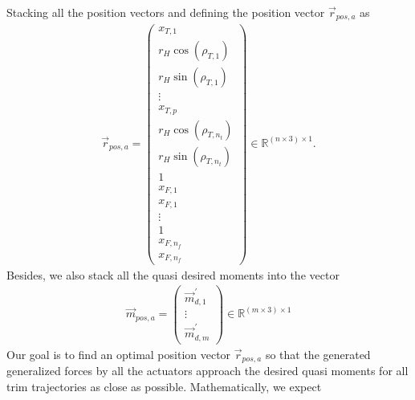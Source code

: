 Stacking all the position vectors and defining the position vector $\vec{r}_{pos,a}$ as
\begin{align}
\vec{r}_{pos,a}=
\begin{pmatrix}
x_{T,1}\\r_{H}\cos(\rho_{T,1})\\r_{H}\sin(\rho_{T,1}) \\ \vdots \\
x_{T,p}\\r_{H}\cos(\rho_{T,n_{t}})\\r_{H}\sin(\rho_{T,n_{t}})  \\
1\\x_{F,1}\\x_{F,1}\\ \vdots \\ 1\\x_{F,n_{f}}\\x_{F,n_{f}}
\end{pmatrix} \in \mathbb{R}^{(n\times 3) \times 1}.
\end{align}
Besides, we also stack all the quasi desired moments into the vector
\begin{align}
\vec{m}_{pos,a}=
\begin{pmatrix}
\vec{m}_{d,1}^{'}\\ \vdots \\ \vec{m}_{d,m}^{'}
\end{pmatrix}\in \mathbb{R}^{(m\times 3)\times 1}
\end{align} 
Our goal is to find an optimal position vector $\vec{r}_{pos,a}$ so that the generated generalized forces by all the actuators approach the desired quasi moments for all trim trajectories as close as possible. Mathematically, we expect
